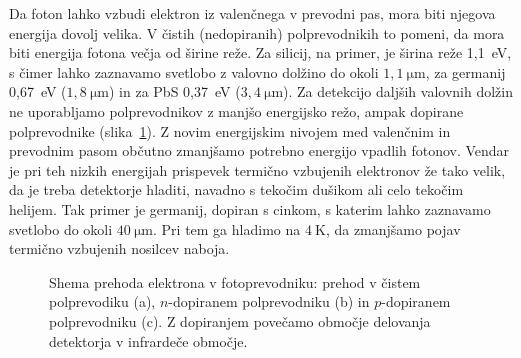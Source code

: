 Da foton lahko vzbudi elektron iz valenčnega v prevodni pas, mora biti njegova energija dovolj velika. 
V čistih (nedopiranih) polprevodnikih to pomeni, da mora biti energija fotona večja od 
širine reže. Za silicij, na primer, je širina reže 1,1~eV, s čimer lahko zaznavamo svetlobo
z valovno dolžino do okoli 
$1,1~\si{\micro\meter}$, za germanij 0,67~eV ($1,8~\si{\micro\meter}$) in za PbS 0,37~eV
($3,4~\si{\micro\meter}$). Za detekcijo daljših valovnih dolžin ne uporabljamo polprevodnikov
z manjšo energijsko režo, ampak dopirane polprevodnike (slika~\ref{fig:FPrevodnik}). 
Z novim energijskim nivojem med valenčnim in prevodnim pasom občutno zmanjšamo 
potrebno energijo vpadlih fotonov. Vendar je pri teh nizkih energijah prispevek termično 
vzbujenih elektronov že tako velik, da je treba detektorje hladiti, navadno s tekočim
dušikom ali celo tekočim helijem. Tak primer je germanij, dopiran s cinkom, 
s katerim lahko zaznavamo svetlobo do okoli $40~\si{\micro\meter}$. Pri tem ga hladimo
na $4~\si{\kelvin}$, da zmanjšamo pojav termično vzbujenih nosilcev naboja. 
\begin{figure}[h]
\centering
\def\svgwidth{150truemm} 

\caption{Shema prehoda elektrona v fotoprevodniku: prehod v čistem polprevodiku (a), 
$n$-dopiranem polprevodniku (b) in $p$-dopiranem polprevodniku (c). 
Z dopiranjem povečamo območje delovanja detektorja v infrardeče območje. }
\label{fig:FPrevodnik}
\end{figure}

